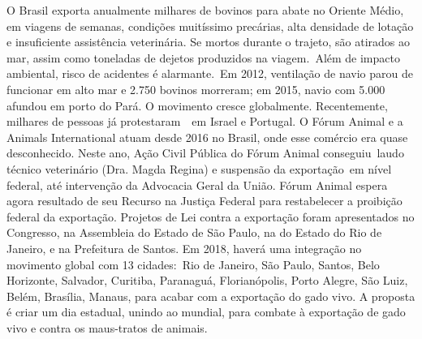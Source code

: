 \documentclass[10pt]{article}
\begin{document}
  O Brasil exporta anualmente milhares de bovinos para abate no Oriente Médio, em viagens de semanas, condições muitíssimo precárias, alta densidade de lotação e insuficiente assistência veterinária. Se mortos durante o trajeto, são atirados ao mar, assim como toneladas de dejetos produzidos na viagem. Além de impacto ambiental, risco de acidentes é alarmante. Em 2012, ventilação de navio parou de funcionar em alto mar e 2.750 bovinos morreram; em 2015, navio com 5.000 afundou em porto do Pará. 
O movimento cresce globalmente. Recentemente, milhares de pessoas já protestaram  em Israel e Portugal. O Fórum Animal e a Animals International atuam desde 2016 no Brasil, onde esse comércio era quase desconhecido. Neste ano, Ação Civil Pública do Fórum Animal conseguiu laudo técnico veterinário (Dra. Magda Regina) e suspensão da exportação em nível federal, até intervenção da Advocacia Geral da União. Fórum Animal espera agora resultado de seu Recurso na Justiça Federal para restabelecer a proibição federal da exportação. 
Projetos de Lei contra a exportação foram apresentados no Congresso, na Assembleia do Estado de São Paulo, na do Estado do Rio de Janeiro, e na Prefeitura de Santos.
Em 2018, haverá uma integração no movimento global com 13 cidades: Rio de Janeiro, São Paulo, Santos, Belo Horizonte, Salvador, Curitiba, Paranaguá, Florianópolis, Porto Alegre, São Luiz, Belém, Brasília, Manaus, para acabar com a exportação do gado vivo. 
A proposta é criar um dia estadual, unindo ao mundial, para combate à exportação de gado vivo e contra os maus-tratos de animais.



\iffalse
\begin{center}
  \textbf{REFERÊNCIAS}
\end{center}


\fi
\end{document}
